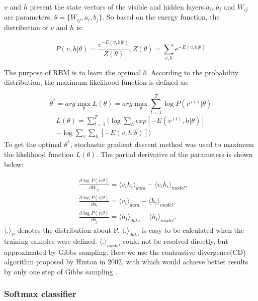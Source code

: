 \documentclass[conference]{IEEEtran}
\begin{document}
$v$ and $h$ present the state vectors of the visible and hidden layers.$a_i$, $b_j$ and $W_{ij}$ are parameters, $\theta = \{W_{ij}, a_i, b_j\}$. So based on the energy function, the distribution of $v$ and $h$ is:

\begin{equation}
P(v,h|\theta) = \frac{e^{-E(v,h|\theta)}}{Z(\theta)}, Z(\theta) = \sum_{v,h}^{}{e^{-E(v,h|\theta)}}
\end{equation}

The purpose of RBM is to learn the optimal $\theta$. According to the probability distribution, the maximum likelihood function is defined as:

\begin{equation}
\theta^* = arg\max\limits_{\theta}L(\theta) = arg\max\limits_{\theta}\sum_{t=1}^T{\log P(v^{(t)}|\theta)}
\end{equation}
\begin{multline}
L(\theta) = \sum_{t=1}^T\Bigg (\log\sum_{h}^{}{exp[-E(v^{(t)},h|\theta)]}\\-\log\sum_{v}^{}{\sum_{h}^{}{[-E(v,h|\theta)]}}\Bigg)
\end{multline}
To get the optimal $\theta^*$, stochastic gradient descent\cite{Leon} method was used to maximum the likelihood function $L(\theta)$. The partial derivative of the parameters is shown below:

\begin{equation}
\begin{split}
&\frac{\partial\log P(v|\theta)}{\partial W_{ij}} = \langle v_i h_i \rangle_{data} -\langle v_i h_i \rangle_{model},\\
&\frac{\partial\log P(v|\theta)}{\partial a_{i}} = \langle v_i \rangle_{data} -\langle h_i \rangle_{model},\\
&\frac{\partial\log P(v|\theta)}{\partial b_{j}} = \langle h_i \rangle_{data} -\langle h_i \rangle_{model}.
\end{split}
\end{equation}
$\langle . \rangle_P$ denotes the distribution about P. $\langle . \rangle_{data}$ is easy to be calculated when the training samples were defined. $\langle . \rangle_{model}$ could not be resolved directly, but approximated by Gibbs sampling. Here we use the contrastive divergence(CD)\cite{Hinton02} algorithm proposed by Hinton in 2002, with which would achieve better results by only one step of Gibbs sampling .

\subsubsection{Softmax classifier}
\end{document}
